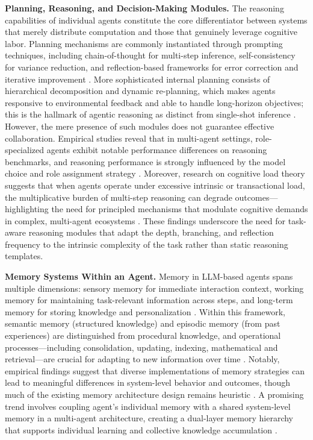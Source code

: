 \documentclass[11pt,a4paper]{article}
\begin{document}
\textbf{Planning, Reasoning, and Decision-Making Modules.} The reasoning capabilities of individual agents constitute the core differentiator between systems that merely distribute computation and those that genuinely leverage cognitive labor. Planning mechanisms are commonly instantiated through prompting techniques, including chain-of-thought for multi-step inference, self-consistency for variance reduction, and reflection-based frameworks for error correction and iterative improvement \cite{arxiv:2309.07864v3}. More sophisticated internal planning consists of hierarchical decomposition and dynamic re-planning, which makes agents responsive to environmental feedback and able to handle long-horizon objectives; this is the hallmark of agentic reasoning as distinct from single-shot inference \cite{arxiv:2601.12538v1}. However, the mere presence of such modules does not guarantee effective collaboration. Empirical studies reveal that in multi-agent settings, role-specialized agents exhibit notable performance differences on reasoning benchmarks, and reasoning performance is strongly influenced by the model choice and role assignment strategy \cite{arxiv:2505.16997v1}. Moreover, research on cognitive load theory suggests that when agents operate under excessive intrinsic or transactional load, the multiplicative burden of multi-step reasoning can degrade outcomes---highlighting the need for principled mechanisms that modulate cognitive demands in complex, multi-agent ecosystems \cite{arxiv:2506.06843v3}. These findings underscore the need for task-aware reasoning modules that adapt the depth, branching, and reflection frequency to the intrinsic complexity of the task rather than static reasoning templates.

\textbf{Memory Systems Within an Agent.} Memory in LLM-based agents spans multiple dimensions: sensory memory for immediate interaction context, working memory for maintaining task-relevant information across steps, and long-term memory for storing knowledge and personalization \cite{arxiv:2404.13501v1}. Within this framework, semantic memory (structured knowledge) and episodic memory (from past experiences) are distinguished from procedural knowledge, and operational processes---including consolidation, updating, indexing, mathematical and retrieval---are crucial for adapting to new information over time \cite{arxiv:2404.13501v1,arxiv:2401.03428v1}. Notably, empirical findings suggest that diverse implementations of memory strategies can lead to meaningful differences in system-level behavior and outcomes, though much of the existing memory architecture design remains heuristic \cite{arxiv:2506.01839v3}. A promising trend involves coupling agent's individual memory with a shared system-level memory in a multi-agent architecture, creating a dual-layer memory hierarchy that supports individual learning and collective knowledge accumulation \cite{arxiv:2504.00587v2}.
\end{document}
